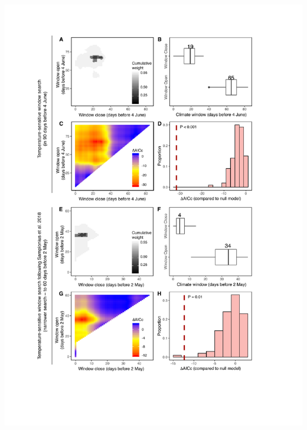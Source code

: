 \documentclass[a4paper, twoside]{templates/ociamthesis}
\begin{document}
\includegraphics[width=1\linewidth]{pdf_chapters/pied/pied_supp_crop_Part5}
\end{document}
